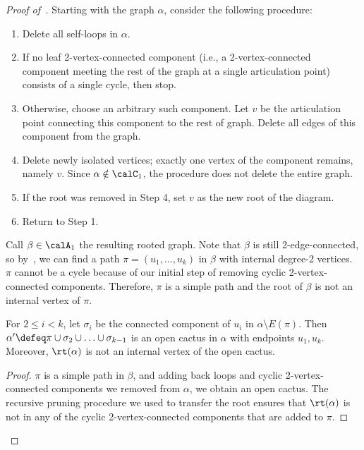 \begin{proof}[Proof of~{}]
    Starting with the graph $\alpha$, consider the following procedure:
    \begin{enumerate}
        \item Delete all self-loops in $\alpha$.
        \item If no leaf 2-vertex-connected
        component (i.e., a 2-vertex-connected
        component meeting the rest of the graph
        at a single articulation point)
        consists of a single cycle,
        then stop.
        \item Otherwise, choose an arbitrary
        such component. Let $v$ be the articulation point connecting this component to the rest of graph. Delete all edges 
        of this component
        from the graph.
        \item Delete newly isolated vertices; exactly
        one vertex of the component remains, namely $v$. Since
        $\alpha\notin \calC_1$, the procedure
        does not delete the entire graph.
    
        \item If the root was removed in Step 4, set $v$ as the new root of the diagram.
        \item Return to Step 1.
    \end{enumerate}
    Call $\beta\in\calA_1$ the
    resulting rooted graph. Note that $\beta$
    is still 2-edge-connected, so
    by~, we can find a path
    $\pi = (u_1, \ldots, u_k)$ in $\beta$
    with internal degree-2 vertices. $\pi$ 
    cannot be a cycle because of our
    initial step of removing cyclic 2-vertex-connected components.
    Therefore, $\pi$ is a simple
    path and the root of $\beta$ is not an
    internal vertex of $\pi$.

    \begin{observation}\label{obs2-open}
        For $2\le i<k$, let $\sigma_i$ be the connected
        component of $u_i$ in $\alpha\setminus E(\pi)$. Then $\alpha' \defeq \pi\cup \sigma_2\cup \ldots \cup \sigma_{k-1}$ is
        an open cactus in $\alpha$ with endpoints $u_1,u_k$. Moreover, $\rt(\alpha)$
        is not an internal vertex of the open cactus.
    \end{observation}

    \begin{proof}
        $\pi$ is a simple
        path in $\beta$, and adding back loops and
        cyclic 2-vertex-connected components we removed from $\alpha$, we obtain an open cactus.
        The recursive pruning procedure we used 
        to transfer
        the root ensures that $\rt(\alpha)$
        is not in any of the cyclic 2-vertex-connected
        components that are added to $\pi$.
    \end{proof}


\end{proof}
